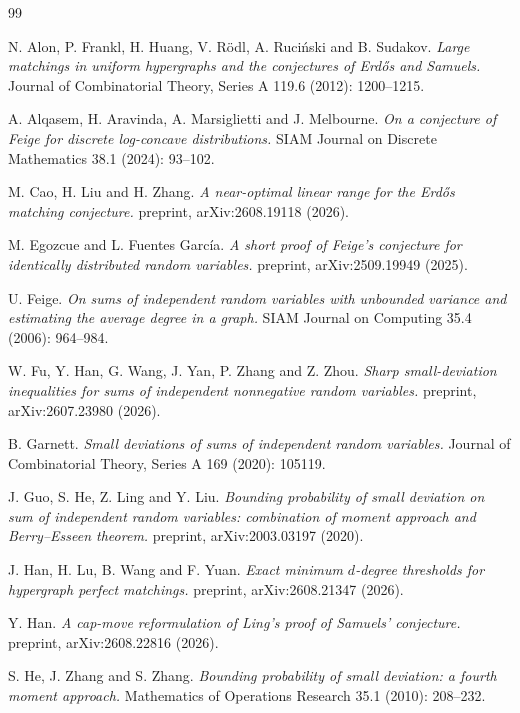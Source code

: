 \documentclass[10pt]{article}
\begin{document}
\begin{thebibliography}{99}

N. Alon, P. Frankl, H. Huang, V. R\"odl, A. Ruci\'nski and B. Sudakov.
\emph{Large matchings in uniform hypergraphs and the conjectures of Erd\H{o}s and Samuels.}
Journal of Combinatorial Theory, Series A 119.6 (2012): 1200--1215.

A. Alqasem, H. Aravinda, A. Marsiglietti and J. Melbourne.
\emph{On a conjecture of Feige for discrete log-concave distributions.}
SIAM Journal on Discrete Mathematics 38.1 (2024): 93--102.

M. Cao, H. Liu and H. Zhang.
\emph{A near-optimal linear range for the Erd\H{o}s matching conjecture.}
preprint, arXiv:2608.19118 (2026).

M. Egozcue and L. Fuentes Garc\'ia.
\emph{A short proof of Feige's conjecture for identically distributed random variables.}
preprint, arXiv:2509.19949 (2025).

U. Feige.
\emph{On sums of independent random variables with unbounded variance and estimating the average degree in a graph.}
SIAM Journal on Computing 35.4 (2006): 964--984.

W. Fu, Y. Han, G. Wang, J. Yan, P. Zhang and Z. Zhou.
\emph{Sharp small-deviation inequalities for sums of independent nonnegative random variables.}
preprint, arXiv:2607.23980 (2026).

B. Garnett.
\emph{Small deviations of sums of independent random variables.}
Journal of Combinatorial Theory, Series A 169 (2020): 105119.

J. Guo, S. He, Z. Ling and Y. Liu.
\emph{Bounding probability of small deviation on sum of independent random variables: combination of moment approach and Berry--Esseen theorem.}
preprint, arXiv:2003.03197 (2020).

J. Han, H. Lu, B. Wang and F. Yuan.
\emph{Exact minimum $d$-degree thresholds for hypergraph perfect matchings.}
preprint, arXiv:2608.21347 (2026).

Y. Han.
\emph{A cap-move reformulation of Ling's proof of Samuels' conjecture.}
preprint, arXiv:2608.22816 (2026).

S. He, J. Zhang and S. Zhang.
\emph{Bounding probability of small deviation: a fourth moment approach.}
Mathematics of Operations Research 35.1 (2010): 208--232.


\end{thebibliography}
\end{document}
